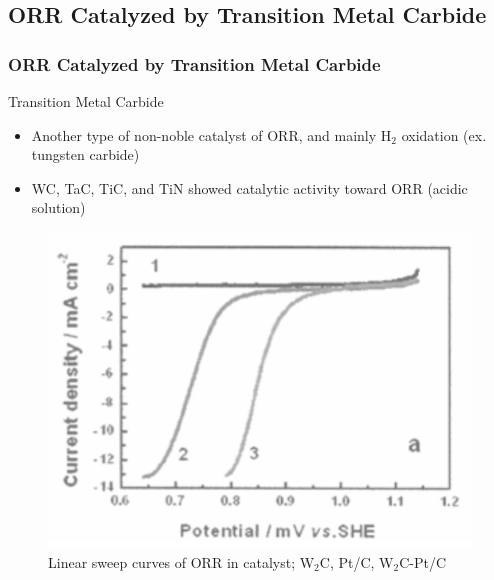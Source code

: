 \documentclass{beamer}
\begin{document}
\subsection{ORR Catalyzed by Transition Metal Carbide }
\begin{frame}
\frametitle{ORR Catalyzed by Transition Metal Carbide }

\begin{block}{Transition Metal Carbide}
\begin{itemize}
\item{Another type of non-noble catalyst of ORR, and mainly \newline H$_2$ oxidation (ex. \alert{tungsten carbide})}
\item{\alert{WC, TaC, TiC, and TiN} showed catalytic activity toward ORR (acidic solution)}
\end{itemize}
\end{block}

\begin{figure}[htbp]
    \begin{center}
    \includegraphics[scale = 0.5]{image227}
    \caption{Linear sweep curves of ORR in catalyst; W$_2$C, Pt/C, W$_2$C-Pt/C}
    \end{center}
\end{figure}
\end{frame}
\end{document}
